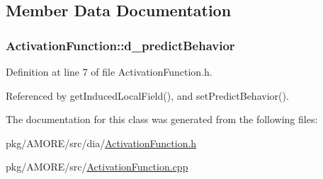 \subsection{Member Data Documentation}
\hypertarget{class_activation_function_a0540673abfbcf1d2f2adfcde4051b483}{
\subsubsection[{d\_\-predictBehavior}]{ {\bf ActivationFunction::d\_\-predictBehavior}}}
\label{class_activation_function_a0540673abfbcf1d2f2adfcde4051b483}


Definition at line 7 of file ActivationFunction.h.



Referenced by getInducedLocalField(), and setPredictBehavior().



The documentation for this class was generated from the following files:\begin{DoxyCompactItemize}
\item 
pkg/AMORE/src/dia/\hyperlink{_activation_function_8h}{ActivationFunction.h}\item 
pkg/AMORE/src/\hyperlink{_activation_function_8cpp}{ActivationFunction.cpp}\end{DoxyCompactItemize}

